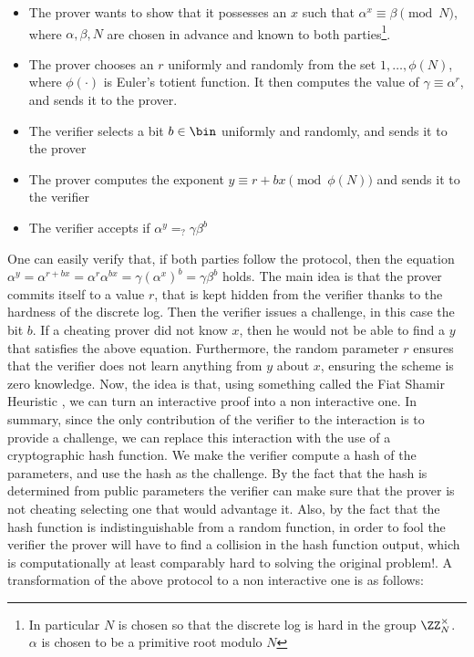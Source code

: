 \documentclass{article}
\begin{document}
\begin{itemize}
    \item The prover wants to show that it possesses an $x$ such that $\alpha^x \equiv \beta \pmod N$, where $\alpha, \beta, N$
          are chosen in advance and known to both parties\footnote{In particular $N$ is chosen so that the discrete log is hard in the group $\ZZ_N^\times$. $\alpha$ is chosen to be a primitive root modulo $N$}.
    \item The prover chooses an $r$ uniformly and randomly from the set $1, \dots, \phi(N)$, where $\phi(\cdot)$ is Euler's
          totient function. It then computes the value of $\gamma \equiv \alpha^r$, and sends it to the prover.
    \item The verifier selects a bit $b \in \bin$ uniformly and randomly, and sends it to the prover
    \item The prover computes the exponent $y \equiv r + bx \pmod{\phi(N)}$ and sends it to the verifier
    \item The verifier accepts if $\alpha^y =_? \gamma \beta^b $
\end{itemize}
One can easily verify that, if both parties follow the protocol, then the equation
$\alpha^y = \alpha^{r + bx} = \alpha^r \alpha^{bx} = \gamma (\alpha^x)^b = \gamma \beta^b$ holds.
The main idea is that the prover commits itself to a value $r$, that is kept hidden from the verifier thanks to
the hardness of the discrete log. Then the verifier issues a challenge, in this case the bit $b$. If a cheating prover
did not know $x$, then he would not be able to find a $y$ that satisfies the above equation. Furthermore, the random
parameter $r$ ensures that the verifier does not learn anything from $y$ about $x$, ensuring the scheme is zero knowledge.
Now, the idea is that, using something called the Fiat Shamir Heuristic \cite{fiatHowProveYourself1987}, we can turn an
interactive proof into a non interactive one.
In summary, since the only contribution of the verifier to the interaction
is to provide a challenge, we can replace this interaction with the use of a cryptographic hash function.
We make the verifier compute a hash of the parameters, and use the hash as the challenge. By the fact that
the hash is determined from public parameters the verifier can make sure that the prover is not cheating selecting one
that would advantage it. Also, by the fact that the hash function is indistinguishable from a random function, in order to
fool the verifier the prover will have to find a collision in the hash function output, which is computationally at least
comparably hard to solving the original problem!.
A transformation of the above protocol
to a non interactive one is as follows:
\end{document}
